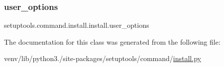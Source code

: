 \mbox{\label{classsetuptools_1_1command_1_1install_1_1install_a4f9ca37416e4efa7d7fe6425cf86883a}} 
\subsubsection{\texorpdfstring{user\+\_\+options}{user\_options}}
{\footnotesize\ttfamily setuptools.\+command.\+install.\+install.\+user\+\_\+options\hspace{0.3cm}{\ttfamily [static]}}



The documentation for this class was generated from the following file\+:\begin{DoxyCompactItemize}
\item 
venv/lib/python3./site-\/packages/setuptools/command/\hyperlink{setuptools_2command_2install_8py}{install.\+py}\end{DoxyCompactItemize}
